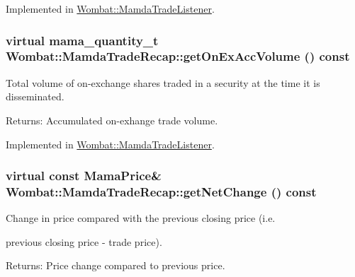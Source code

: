 Implemented in \hyperlink{classWombat_1_1MamdaTradeListener_e4a1bd8bfd6143e85e08ebd98fa8b8c1}{Wombat::Mamda\-Trade\-Listener}.\hypertarget{classWombat_1_1MamdaTradeRecap_a876a7f85a983eec3a529d125721615b}{
\subsubsection[getOnExAccVolume]{\setlength{\rightskip}{0pt plus 5cm}virtual mama\_\-quantity\_\-t Wombat::Mamda\-Trade\-Recap::get\-On\-Ex\-Acc\-Volume () const}}
\label{classWombat_1_1MamdaTradeRecap_a876a7f85a983eec3a529d125721615b}


Total volume of on-exchange shares traded in a security at the time it is disseminated. 

\begin{Desc}
\item[Returns:]Accumulated on-exhange trade volume. \end{Desc}


Implemented in \hyperlink{classWombat_1_1MamdaTradeListener_5de3d861733f64d1a4b941c32cd1bb4b}{Wombat::Mamda\-Trade\-Listener}.\hypertarget{classWombat_1_1MamdaTradeRecap_6f0e8f7dd9edd3f29e29c1d983d6b7ff}{
\subsubsection[getNetChange]{\setlength{\rightskip}{0pt plus 5cm}virtual const Mama\-Price\& Wombat::Mamda\-Trade\-Recap::get\-Net\-Change () const}}
\label{classWombat_1_1MamdaTradeRecap_6f0e8f7dd9edd3f29e29c1d983d6b7ff}


Change in price compared with the previous closing price (i.e. 

previous closing price - trade price).

\begin{Desc}
\item[Returns:]Price change compared to previous price. \end{Desc}


